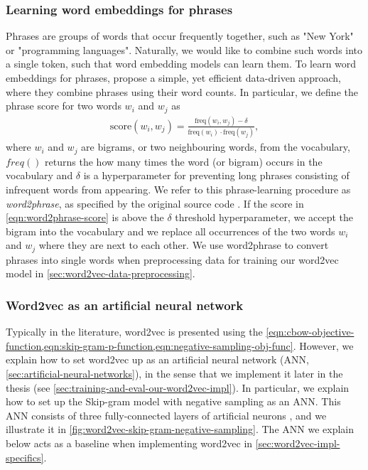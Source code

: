 \subsubsection{Learning word embeddings for phrases}
\label{sec:learning-word-embeddings-for-phrases}
Phrases are groups of words that occur frequently together, such as "New York" or "programming languages". Naturally, we would like to combine such words into a single token, such that word embedding models can learn them. To learn word embeddings for phrases, \cite[4 Learning Phrases]{mikolov2013b} propose a simple, yet efficient data-driven approach, where they combine phrases using their word counts. In particular, we define the phrase score for two words $w_i$ and $w_j$ as
\begin{align}
    \text{score}(w_i, w_j) = \frac{\text{freq}(w_i, w_j) - \delta}{\text{freq}(w_i) \cdot \text{freq}(w_j)},
    \label{eqn:word2phrase-score}
\end{align}
where $w_i$ and $w_j$ are bigrams, or two neighbouring words, from the vocabulary, $freq()$ returns the how many times the word (or bigram) occurs in the vocabulary and $\delta$ is a hyperparameter for preventing long phrases consisting of infrequent words from appearing. We refer to this phrase-learning procedure as \textit{word2phrase}, as specified by the original source code \cites{Word2phraseCCode}. If the score in \cref{eqn:word2phrase-score} is above the $\delta$ threshold hyperparameter, we accept the bigram into the vocabulary and we replace all occurrences of the two words $w_i$ and $w_j$ where they are next to each other. We use word2phrase to convert phrases into single words when preprocessing data for training our word2vec model in \cref{sec:word2vec-data-preprocessing}.

\subsubsection{Word2vec as an artificial neural network}
\label{sec:word2vec-as-an-ann}
Typically in the literature, word2vec is presented using the \cref{eqn:cbow-objective-function,eqn:skip-gram-p-function,eqn:negative-sampling-obj-func}. However, we explain how to set word2vec up as an artificial neural network (ANN, \cref{sec:artificial-neural-networks}), in the sense that we implement it later in the thesis (see \cref{sec:training-and-eval-our-word2vec-impl}). In particular, we explain how to set up the Skip-gram model with negative sampling as an ANN. This ANN consists of three fully-connected layers of artificial neurons \cite{rong2016word2vec}, and we illustrate it in \cref{fig:word2vec-skip-gram-negative-sampling}. The ANN we explain below acts as a baseline when implementing word2vec in \cref{sec:word2vec-impl-specifics}.

